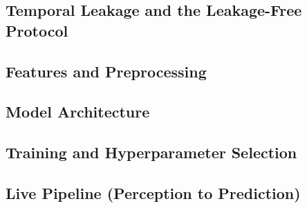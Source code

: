 \subsection{Temporal Leakage and the Leakage-Free Protocol}

\subsection{Features and Preprocessing}

\subsection{Model Architecture}

\subsection{Training and Hyperparameter Selection}

\subsection{Live Pipeline (Perception to Prediction)}

